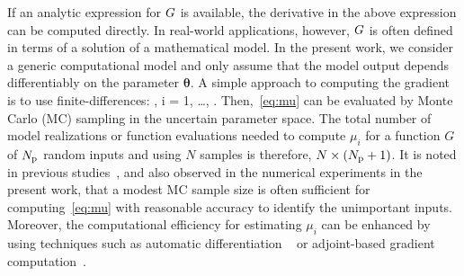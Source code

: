 If an analytic expression for $G$ is available, the derivative in the above
expression can be computed directly. In real-world applications, 
however, $G$ is
often defined in terms of a solution of a mathematical model.  In the
present work, we consider a generic computational model and only assume that
the model output depends differentiably on the parameter $\bm{\theta}$. A
simple approach to computing the gradient is to use finite-differences: 
\be
{} 
\approx
{}, \quad i = 1, \ldots, \Np. 
\label{eq:partial}
\ee
Then,~\eqref{eq:mu} can be evaluated by Monte Carlo (MC) sampling in
the uncertain parameter space. 
The total number of model realizations or function evaluations
needed to
compute $\mu_i$ for a function $G$ of ${N_\text{p}}$ random inputs and using $N$ samples is
therefore, $N\times({N_\text{p}}+1)$. 
It is noted in previous studies~\cite{Kucherenko:2016,Kucherenko:2009},
and also
observed in the numerical experiments in the present work, that a modest MC sample size is often sufficient for computing~\eqref{eq:mu} with
reasonable accuracy to identify the unimportant inputs. Moreover, the
computational efficiency for estimating $\mu_i$ can be enhanced by using
techniques such as automatic differentiation
~\cite{Kiparissides:2009} or adjoint-based gradient computation~\cite{jameson1988aerodynamic,gunzburger2003perspectives,Borzi2011,AlexanderianPetraStadlerEtAl17}. 

